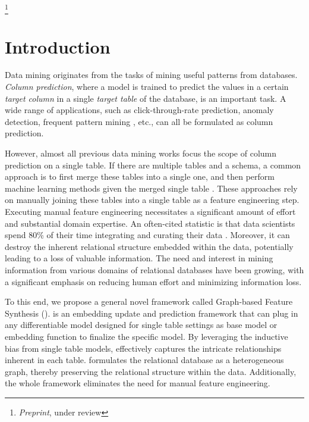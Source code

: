 \maketitle
\pagestyle{plain}
\begingroup
\renewcommand{\thefootnote}{}
\footnote{\noindent \emph{Preprint}, under review}
\addtocounter{footnote}{-1}
\endgroup

\section{Introduction}

Data mining originates from the tasks of mining useful patterns from databases. \emph{Column prediction}, where a model is trained to predict the values in a certain \emph{target column} in a single \emph{target table} of the database, is an important task. A wide range of applications, such as click-through-rate prediction\cite{guo2017deepfm, cheng2016wide, zhou2018deep, guo2022miss}, anomaly detection\cite{han2022adbench, liu2008isolation, zhao2018xgbod, tang2022rethinking}, frequent pattern mining \cite{han2007frequent, agrawal1994fast,han2000mining}, etc., can all be formulated as column prediction.

However, almost all previous data mining works focus the scope of column prediction on a single table. If there are multiple tables and a schema, a common approach is to first merge these tables into a single one, and then perform machine learning methods given the merged single table \cite{park2022end, rendle2010factorization,qu2018product}.
These approaches rely on manually joining these tables into a single table as a feature engineering step. Executing manual feature engineering necessitates a significant amount of effort and substantial domain expertise. An often-cited statistic is that data scientists spend 80\% of their time integrating and curating their data \cite{create2020}. Moreover, it can destroy the inherent relational structure embedded within the data, potentially leading to a loss of valuable information. The need and interest in mining information from various domains of relational databases have been growing, with a significant emphasis on reducing human effort and minimizing information loss.

To this end, we propose a general novel framework called Graph-based Feature Synthesis (\model{}).
\model{} is an embedding update and prediction framework that can plug in any differentiable model designed for single table settings 
as base model or embedding function to finalize the specific model.
By leveraging the inductive bias from single table models, \model{} effectively captures the intricate relationships inherent in each table. \model{} formulates the relational database as a heterogeneous graph, thereby preserving the relational structure within the data. Additionally, the whole framework eliminates the need for manual feature engineering.

